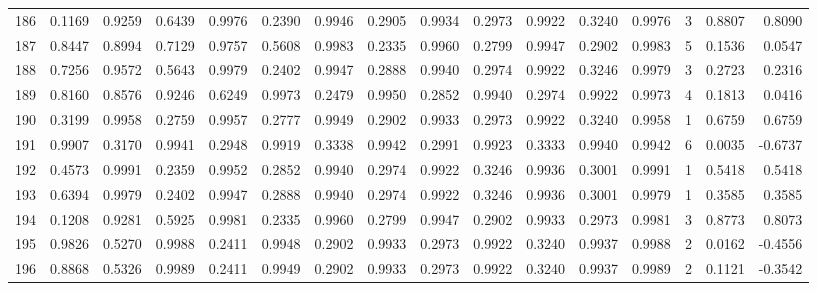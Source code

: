 \begin{tabular}{lrrrrrrrrrrrrrrr}
186 &      0.1169 &  0.9259 &  0.6439 &  0.9976 &  0.2390 &  0.9946 &  0.2905 &  0.9934 &  0.2973 &  0.9922 &   0.3240 &     0.9976 &      3 &                    0.8807 &                     0.8090 \\
187 &      0.8447 &  0.8994 &  0.7129 &  0.9757 &  0.5608 &  0.9983 &  0.2335 &  0.9960 &  0.2799 &  0.9947 &   0.2902 &     0.9983 &      5 &                    0.1536 &                     0.0547 \\
188 &      0.7256 &  0.9572 &  0.5643 &  0.9979 &  0.2402 &  0.9947 &  0.2888 &  0.9940 &  0.2974 &  0.9922 &   0.3246 &     0.9979 &      3 &                    0.2723 &                     0.2316 \\
189 &      0.8160 &  0.8576 &  0.9246 &  0.6249 &  0.9973 &  0.2479 &  0.9950 &  0.2852 &  0.9940 &  0.2974 &   0.9922 &     0.9973 &      4 &                    0.1813 &                     0.0416 \\
190 &      0.3199 &  0.9958 &  0.2759 &  0.9957 &  0.2777 &  0.9949 &  0.2902 &  0.9933 &  0.2973 &  0.9922 &   0.3240 &     0.9958 &      1 &                    0.6759 &                     0.6759 \\
191 &      0.9907 &  0.3170 &  0.9941 &  0.2948 &  0.9919 &  0.3338 &  0.9942 &  0.2991 &  0.9923 &  0.3333 &   0.9940 &     0.9942 &      6 &                    0.0035 &                    -0.6737 \\
192 &      0.4573 &  0.9991 &  0.2359 &  0.9952 &  0.2852 &  0.9940 &  0.2974 &  0.9922 &  0.3246 &  0.9936 &   0.3001 &     0.9991 &      1 &                    0.5418 &                     0.5418 \\
193 &      0.6394 &  0.9979 &  0.2402 &  0.9947 &  0.2888 &  0.9940 &  0.2974 &  0.9922 &  0.3246 &  0.9936 &   0.3001 &     0.9979 &      1 &                    0.3585 &                     0.3585 \\
194 &      0.1208 &  0.9281 &  0.5925 &  0.9981 &  0.2335 &  0.9960 &  0.2799 &  0.9947 &  0.2902 &  0.9933 &   0.2973 &     0.9981 &      3 &                    0.8773 &                     0.8073 \\
195 &      0.9826 &  0.5270 &  0.9988 &  0.2411 &  0.9948 &  0.2902 &  0.9933 &  0.2973 &  0.9922 &  0.3240 &   0.9937 &     0.9988 &      2 &                    0.0162 &                    -0.4556 \\
196 &      0.8868 &  0.5326 &  0.9989 &  0.2411 &  0.9949 &  0.2902 &  0.9933 &  0.2973 &  0.9922 &  0.3240 &   0.9937 &     0.9989 &      2 &                    0.1121 &                    -0.3542 \\

\end{tabular}
